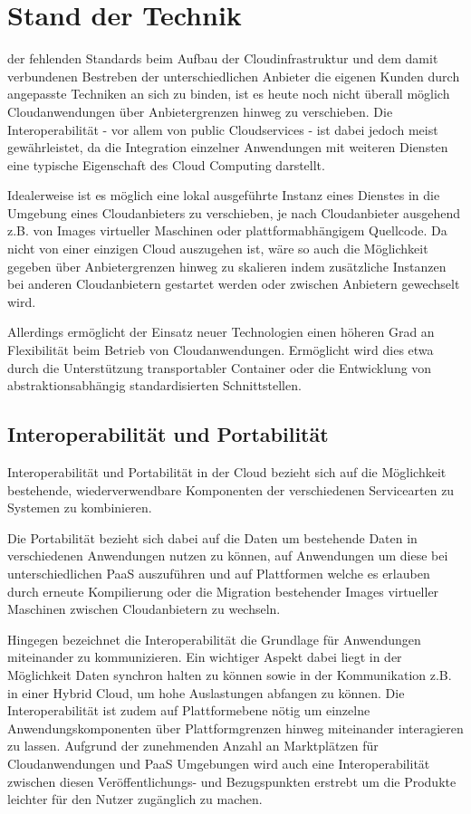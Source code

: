 \section{Stand der Technik}
\label{sec_facts}

 der fehlenden Standards beim Aufbau der Cloudinfrastruktur und dem damit verbundenen Bestreben der unterschiedlichen Anbieter die eigenen Kunden durch angepasste Techniken an sich zu binden, ist es heute noch nicht überall möglich Cloudanwendungen über Anbietergrenzen hinweg zu verschieben. Die Interoperabilität - vor allem von public Cloudservices - ist dabei jedoch meist gewährleistet, da die Integration einzelner Anwendungen mit weiteren Diensten eine typische Eigenschaft des Cloud Computing darstellt. \cite{nistStandards}

Idealerweise ist es möglich eine lokal ausgeführte Instanz eines Dienstes in die Umgebung eines Cloudanbieters zu verschieben, je nach Cloudanbieter ausgehend z.B. von Images virtueller Maschinen oder plattformabhängigem Quellcode. Da nicht von einer einzigen Cloud auszugehen ist, wäre so auch die Möglichkeit gegeben über Anbietergrenzen hinweg zu skalieren indem zusätzliche Instanzen bei anderen Cloudanbietern gestartet werden oder zwischen Anbietern gewechselt wird. \cite{nistStandards}

Allerdings ermöglicht der Einsatz neuer Technologien einen höheren Grad an Flexibilität beim Betrieb von Cloudanwendungen. Ermöglicht wird dies etwa durch die Unterstützung transportabler Container oder die Entwicklung von abstraktionsabhängig standardisierten Schnittstellen.

\subsection{Interoperabilität und Portabilität}
Interoperabilität und Portabilität in der Cloud bezieht sich auf die Möglichkeit bestehende, wiederverwendbare Komponenten der verschiedenen Servicearten zu Systemen zu kombinieren.

Die Portabilität bezieht sich dabei auf die Daten um bestehende Daten in verschiedenen Anwendungen nutzen zu können, auf Anwendungen um diese bei unterschiedlichen PaaS auszuführen und auf Plattformen welche es erlauben durch erneute Kompilierung oder die Migration bestehender Images virtueller Maschinen zwischen Cloudanbietern zu wechseln.

Hingegen bezeichnet die Interoperabilität die Grundlage für Anwendungen miteinander zu kommunizieren. Ein wichtiger Aspekt dabei liegt in der Möglichkeit Daten synchron halten zu können sowie in der Kommunikation z.B. in einer Hybrid Cloud, um hohe Auslastungen abfangen zu können.
Die Interoperabilität ist zudem auf Plattformebene nötig um einzelne Anwendungskomponenten über Plattformgrenzen hinweg miteinander interagieren zu lassen.
Aufgrund der zunehmenden Anzahl an Marktplätzen für Cloudanwendungen und PaaS Umgebungen wird auch eine Interoperabilität zwischen diesen Veröffentlichungs- und Bezugspunkten erstrebt um die Produkte leichter für den Nutzer zugänglich zu machen.

